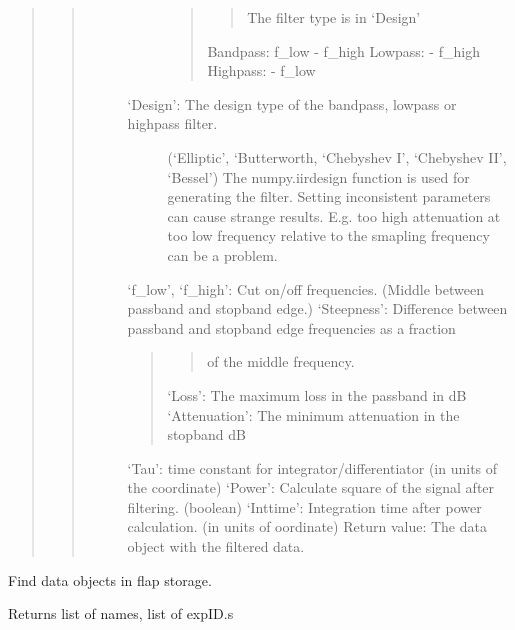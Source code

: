 \documentclass[letterpaper,10pt,english]{sphinxmanual}
\begin{document}
\begin{fulllineitems}
\begin{quote}
\begin{quote}
\begin{description}
\begin{description}
\begin{quote}
\begin{quote}
The filter type is in ‘Design’
\end{quote}

Bandpass: f\_low - f\_high
Lowpass: - f\_high
Highpass: - f\_low
\end{quote}

\item[{‘Design’: The design type of the bandpass, lowpass or highpass filter.}] \leavevmode
(‘Elliptic’, ‘Butterworth, ‘Chebyshev I’, ‘Chebyshev II’, ‘Bessel’)
The numpy.iirdesign function is used for generating the filter.
Setting inconsistent parameters can cause strange results. E.g. too high attenuation
at too low frequency relative to the smapling frequency can be a problem.

\end{description}

‘f\_low’, ‘f\_high’: Cut on/off frequencies. (Middle between passband and stopband edge.)
‘Steepness’: Difference between passband and stopband edge frequencies as a fraction
\begin{quote}
\begin{quote}

of the middle frequency.
\end{quote}

‘Loss’: The maximum loss in the passband in dB
‘Attenuation’: The minimum attenuation in the stopband dB
\end{quote}

‘Tau’: time constant for integrator/differentiator (in units of the coordinate)
‘Power’: Calculate square of the signal after filtering. (boolean)
‘Inttime’: Integration time after power calculation. (in units of oordinate)    Return value: The data object with the filtered data.

\end{description}
\end{quote}
\end{quote}

\end{fulllineitems}


\begin{fulllineitems}
\label{\detokenize{data_object:flap.data_object.find_data_objects}}
Find data objects in flap storage.

Returns list of names, list of expID.s

\end{fulllineitems}
\end{document}
